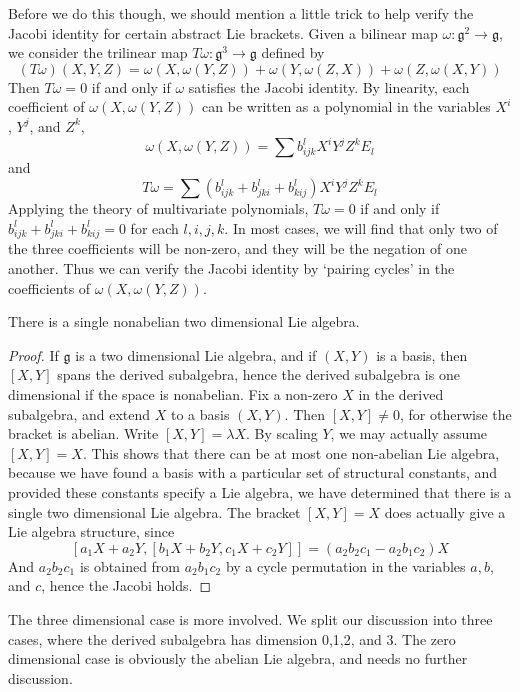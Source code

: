 Before we do this though, we should mention a little trick to help verify the Jacobi identity for certain abstract Lie brackets. Given a bilinear map $\omega: \mathfrak{g}^2 \to \mathfrak{g}$, we consider the trilinear map $T\omega: \mathfrak{g}^3 \to \mathfrak{g}$ defined by
%
\[ (T \omega)(X,Y,Z) = \omega(X, \omega(Y,Z)) + \omega(Y,\omega(Z,X)) + \omega(Z,\omega(X,Y)) \]
%
Then $T \omega = 0$ if and only if $\omega$ satisfies the Jacobi identity. By linearity, each coefficient of $\omega(X,\omega(Y,Z))$ can be written as a polynomial in the variables $X^i$, $Y^j$, and $Z^k$,
%
\[ \omega(X, \omega(Y,Z)) = \sum b_{ijk}^l X^i Y^j Z^k E_l \]
%
and
%
\[ T\omega = \sum (b_{ijk}^l + b_{jki}^l + b_{kij}^l) X^i Y^j Z^k E_l \]
%
Applying the theory of multivariate polynomials, $T \omega = 0$ if and only if $b_{ijk}^l + b_{jki}^l + b_{kij}^l = 0$ for each $l, i, j, k$. In most cases, we will find that only two of the three coefficients will be non-zero, and they will be the negation of one another. Thus we can verify the Jacobi identity by `pairing cycles' in the coefficients of $\omega(X,\omega(Y,Z))$.

\begin{theorem}
    There is a single nonabelian two dimensional Lie algebra.
\end{theorem}
\begin{proof}
    If $\mathfrak{g}$ is a two dimensional Lie algebra, and if $(X,Y)$ is a basis, then $[X,Y]$ spans the derived subalgebra, hence the derived subalgebra is one dimensional if the space is nonabelian. Fix a non-zero $X$ in the derived subalgebra, and extend $X$ to a basis $(X,Y)$. Then $[X,Y] \neq 0$, for otherwise the bracket is abelian. Write $[X,Y] = \lambda X$. By scaling $Y$, we may actually assume $[X,Y] = X$. This shows that there can be at most one non-abelian Lie algebra, because we have found a basis with a particular set of structural constants, and provided these constants specify a Lie algebra, we have determined that there is a single two dimensional Lie algebra. The bracket $[X,Y] = X$ does actually give a Lie algebra structure, since
    \[ [a_1X + a_2Y, [b_1X + b_2Y, c_1X + c_2Y]] = (a_2b_2c_1 - a_2b_1c_2) X \]
    And $a_2b_2c_1$ is obtained from $a_2b_1c_2$ by a cycle permutation in the variables $a,b$, and $c$, hence the Jacobi holds.
\end{proof}

The three dimensional case is more involved. We split our discussion into three cases, where the derived subalgebra has dimension 0,1,2, and 3. The zero dimensional case is obviously the abelian Lie algebra, and needs no further discussion.

